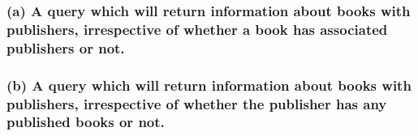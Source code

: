 \documentclass[12pt]{article}
\begin{document}
\subsubsection*{(a) A query which will return information about books with publishers, irrespective of whether a book
has associated publishers or not.}


\subsubsection*{(b) A query which will return information about books with publishers, irrespective of whether the
publisher has any published books or not.}


\newpage
\end{document}
